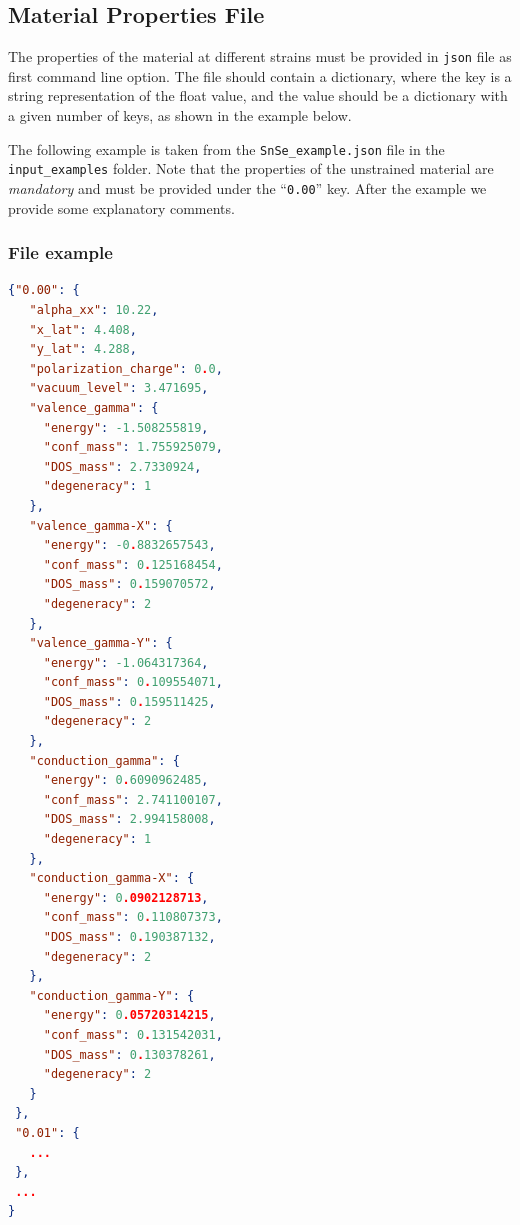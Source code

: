 \documentclass[a4paper,12pt]{article}
\begin{document}
\subsection{Material Properties File}
The properties of the material at different strains must be provided in \texttt{json} file as first command line option. 
The file should contain a dictionary, where the key is a string representation of the
float value, and the value should be a dictionary with a given number of keys, as shown in
the example below.

The following example is taken from the \texttt{SnSe\_example.json} file in the \texttt{input\_examples} folder. Note that the properties of the unstrained material are \emph{mandatory} and must be provided under the ``\texttt{0.00}'' key. After the example we provide some explanatory comments.

\subsubsection*{File example}

\begin{lstlisting}[language=json,firstnumber=1]
{"0.00": {
   "alpha_xx": 10.22,
   "x_lat": 4.408,
   "y_lat": 4.288,
   "polarization_charge": 0.0,
   "vacuum_level": 3.471695,
   "valence_gamma": { 
     "energy": -1.508255819,
     "conf_mass": 1.755925079,
     "DOS_mass": 2.7330924,
     "degeneracy": 1
   },
   "valence_gamma-X": {
     "energy": -0.8832657543,
     "conf_mass": 0.125168454,
     "DOS_mass": 0.159070572,
     "degeneracy": 2
   },
   "valence_gamma-Y": {
     "energy": -1.064317364,
     "conf_mass": 0.109554071,
     "DOS_mass": 0.159511425,
     "degeneracy": 2
   },
   "conduction_gamma": {
     "energy": 0.6090962485,
     "conf_mass": 2.741100107,
     "DOS_mass": 2.994158008,
     "degeneracy": 1
   },
   "conduction_gamma-X": {
     "energy": 0.0902128713,
     "conf_mass": 0.110807373,
     "DOS_mass": 0.190387132,
     "degeneracy": 2
   },
   "conduction_gamma-Y": {
     "energy": 0.05720314215,
     "conf_mass": 0.131542031,
     "DOS_mass": 0.130378261,
     "degeneracy": 2
   }
 },
 "0.01": {
   ...
 },
 ...
}
\end{lstlisting}
\end{document}
